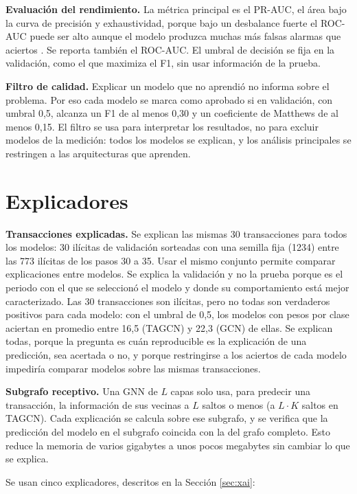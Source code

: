 \textbf{Evaluación del rendimiento.} La métrica principal es el PR-AUC, el área bajo la curva
de precisión y exhaustividad, porque bajo un desbalance fuerte el ROC-AUC puede ser alto
aunque el modelo produzca muchas más falsas alarmas que aciertos \cite{Saito2015PR}. Se
reporta también el ROC-AUC. El umbral de decisión se fija en la validación, como el que
maximiza el F1, sin usar información de la prueba.

\textbf{Filtro de calidad.} Explicar un modelo que no aprendió no informa sobre el problema.
Por eso cada modelo se marca como aprobado si en validación, con umbral 0,5, alcanza un F1 de
al menos 0,30 y un coeficiente de Matthews \cite{Chicco2020MCC} de al menos 0,15. El filtro se
usa para interpretar los resultados, no para excluir modelos de la medición: todos los modelos
se explican, y los análisis principales se restringen a las arquitecturas que aprenden.

\section{Explicadores}\label{sec:explicadores}

\textbf{Transacciones explicadas.} Se explican las mismas 30 transacciones para todos los
modelos: 30 ilícitas de validación sorteadas con una semilla fija (1234) entre las 773
ilícitas de los pasos 30 a 35. Usar el mismo conjunto permite comparar explicaciones entre
modelos. Se explica la validación y no la prueba porque es el periodo con el que se
seleccionó el modelo y donde su comportamiento está mejor caracterizado. Las 30 transacciones son ilícitas, pero no todas son
verdaderos positivos para cada modelo: con el umbral de 0,5, los modelos con pesos por clase
aciertan en promedio entre 16,5 (TAGCN) y 22,3 (GCN) de ellas. Se explican todas, porque la
pregunta es cuán reproducible es la explicación de una predicción, sea acertada o no, y porque
restringirse a los aciertos de cada modelo impediría comparar modelos sobre las mismas
transacciones.

\textbf{Subgrafo receptivo.} Una GNN de $L$ capas solo usa, para predecir una transacción, la
información de sus vecinas a $L$ saltos o menos (a $L \cdot K$ saltos en TAGCN). Cada
explicación se calcula sobre ese subgrafo, y se verifica que la predicción del modelo en el
subgrafo coincida con la del grafo completo. Esto reduce la memoria de varios gigabytes a
unos pocos megabytes sin cambiar lo que se explica.

Se usan cinco explicadores, descritos en la Sección \ref{sec:xai}:

